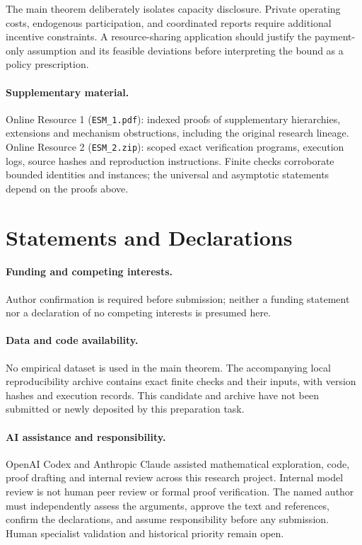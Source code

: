 \documentclass[11pt]{article}
\theoremstyle{definition}\newtheorem{definition}[theorem]{Definition}
\theoremstyle{remark}\newtheorem{remark}[theorem]{Remark}
\begin{document}
The main theorem deliberately isolates capacity disclosure. Private operating
costs, endogenous participation, and coordinated reports require additional
incentive constraints. A resource-sharing application should justify the
payment-only assumption and its feasible deviations before interpreting the
bound as a policy prescription.

\paragraph{Supplementary material.}
Online Resource 1 (\texttt{ESM\_1.pdf}): indexed proofs of supplementary
hierarchies, extensions and mechanism obstructions, including the original
research lineage. Online Resource 2 (\texttt{ESM\_2.zip}): scoped exact
verification programs, execution logs, source hashes and reproduction
instructions. Finite checks corroborate bounded identities and instances;
the universal and asymptotic statements depend on the proofs above.

\section*{Statements and Declarations}
\paragraph{Funding and competing interests.}
Author confirmation is required before submission; neither a funding statement
nor a declaration of no competing interests is presumed here.
\paragraph{Data and code availability.}
No empirical dataset is used in the main theorem. The accompanying local
reproducibility archive contains exact finite checks and their inputs, with
version hashes and execution records. This candidate and archive have not
been submitted or newly deposited by this preparation task.
\paragraph{AI assistance and responsibility.}
OpenAI Codex and Anthropic Claude assisted mathematical exploration, code,
proof drafting and internal review across this research project. Internal
model review is not human peer review or formal proof verification. The named
author must independently assess the arguments, approve the text and
references, confirm the declarations, and assume responsibility before any
submission. Human specialist validation and historical priority remain open.
\end{document}
